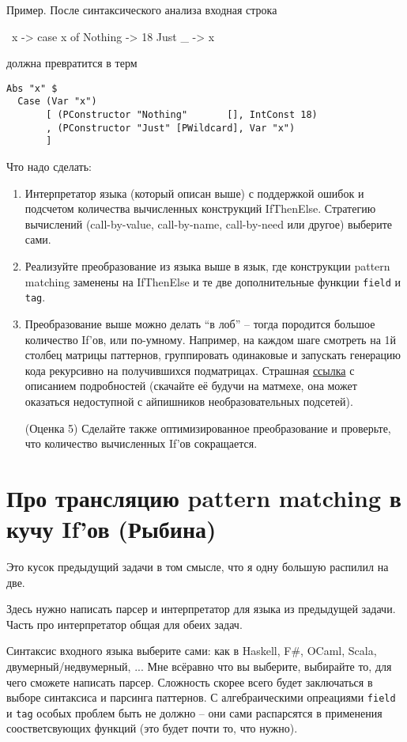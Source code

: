 \documentclass[a4paper,14pt]{article}
\def\hsinline{\lstinline[language=haskell]}
\begin{document}
Пример. После синтаксического анализа входная строка
\begin{hslisting}
\ x -> case x of 
         Nothing -> 18 
         Just _  -> x
\end{hslisting}
должна превратится в терм
\begin{lstlisting}[mathescape=false]
Abs "x" $ 
  Case (Var "x") 
       [ (PConstructor "Nothing"       [], IntConst 18)
       , (PConstructor "Just" [PWildcard], Var "x")
       ]
\end{lstlisting}

Что надо сделать:
\begin{enumerate}
 \item Интерпретатор языка (который описан выше) с поддержкой ошибок и подсчетом количества вычисленных конструкций IfThenElse. Стратегию вычислений (call-by-value, call-by-name, call-by-need или другое) выберите сами.
 \item Реализуйте преобразование из языка выше в язык, где конструкции pattern matching заменены на IfThenElse и те две дополнительные функции \hsinline=field= и \hsinline=tag=.
 
 \item Преобразование выше можно делать ``в лоб'' -- тогда породится большое количество If'ов, или по-умному. Например, на каждом шаге смотреть на 1й столбец матрицы паттернов, группировать одинаковые и запускать генерацию кода рекурсивно на получившихся подматрицах. Страшная \href{https://dl.acm.org/citation.cfm?id=507641}{ссылка} с описанием подробностей (скачайте её будучи на матмехе, она может оказаться недоступной с айпишников необразовательных подсетей). 
  
  (Оценка 5) Сделайте также оптимизированное преобразование и проверьте, что количество вычисленных If'ов сокращается.
\end{enumerate}


\section{Про трансляцию pattern matching в кучу If'ов (Рыбина)}

Это кусок предыдущий задачи в том смысле, что я одну большую распилил на две.

Здесь нужно написать парсер и интерпретатор для языка из предыдущей задачи. Часть про интерпретатор общая для обеих задач.

Синтаксис входного языка выберите сами: как в Haskell, F\#, OCaml, Scala, двумерный/недвумерный, ... Мне всёравно что вы выберите, выбирайте то, для чего сможете написать парсер. Сложность скорее всего будет заключаться в выборе синтаксиса и парсинга паттернов. С алгебраическими опреациями \hsinline=field= и \hsinline=tag= особых проблем быть не должно -- они сами распарсятся в применения соостветсвующих функций (это будет почти то, что нужно).
 
\end{document}
